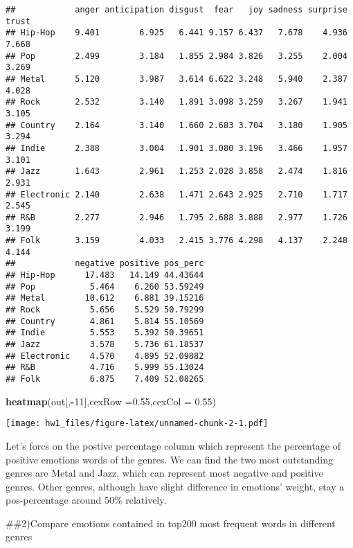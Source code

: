\documentclass[]{article}
\newenvironment{Shaded}{\begin{snugshade}}{\end{snugshade}}
\newcommand{\DataTypeTok}[1]{\textcolor[rgb]{0.13,0.29,0.53}{#1}}
\newcommand{\DecValTok}[1]{\textcolor[rgb]{0.00,0.00,0.81}{#1}}
\newcommand{\FloatTok}[1]{\textcolor[rgb]{0.00,0.00,0.81}{#1}}
\newcommand{\KeywordTok}[1]{\textcolor[rgb]{0.13,0.29,0.53}{\textbf{#1}}}
\newcommand{\NormalTok}[1]{#1}
\newcommand{\OperatorTok}[1]{\textcolor[rgb]{0.81,0.36,0.00}{\textbf{#1}}}
\begin{document}
\begin{verbatim}
##            anger anticipation disgust  fear   joy sadness surprise trust
## Hip-Hop    9.401        6.925   6.441 9.157 6.437   7.678    4.936 7.668
## Pop        2.499        3.184   1.855 2.984 3.826   3.255    2.004 3.269
## Metal      5.120        3.987   3.614 6.622 3.248   5.940    2.387 4.028
## Rock       2.532        3.140   1.891 3.098 3.259   3.267    1.941 3.105
## Country    2.164        3.140   1.660 2.683 3.704   3.180    1.905 3.294
## Indie      2.388        3.004   1.901 3.080 3.196   3.466    1.957 3.101
## Jazz       1.643        2.961   1.253 2.028 3.858   2.474    1.816 2.931
## Electronic 2.140        2.638   1.471 2.643 2.925   2.710    1.717 2.545
## R&B        2.277        2.946   1.795 2.688 3.888   2.977    1.726 3.199
## Folk       3.159        4.033   2.415 3.776 4.298   4.137    2.248 4.144
##            negative positive pos_perc
## Hip-Hop      17.483   14.149 44.43644
## Pop           5.464    6.260 53.59249
## Metal        10.612    6.881 39.15216
## Rock          5.656    5.529 50.79299
## Country       4.861    5.814 55.10569
## Indie         5.553    5.392 50.39651
## Jazz          3.578    5.736 61.18537
## Electronic    4.570    4.895 52.09882
## R&B           4.716    5.999 55.13024
## Folk          6.875    7.409 52.08265
\end{verbatim}

\begin{Shaded}
\begin{Highlighting}[]
\KeywordTok{heatmap}\NormalTok{(out[,}\OperatorTok{-}\DecValTok{11}\NormalTok{],}\DataTypeTok{cexRow =}\FloatTok{0.55}\NormalTok{,}\DataTypeTok{cexCol =} \FloatTok{0.55}\NormalTok{)}
\end{Highlighting}
\end{Shaded}

\texttt{[image: hw1\_files/figure-latex/unnamed-chunk-2-1.pdf]}

Let's forcs on the postive percentage column which represent the
percentage of positive emotions words of the genres. We can find the two
most outstanding genres are Metal and Jazz, which can represent most
negative and positive genres. Other genres, although have slight
difference in emotions' weight, stay a pos-percentage around 50\%
relatively.

\#\#2)Compare emotions contained in top200 most frequent words in
different genres
\end{document}
